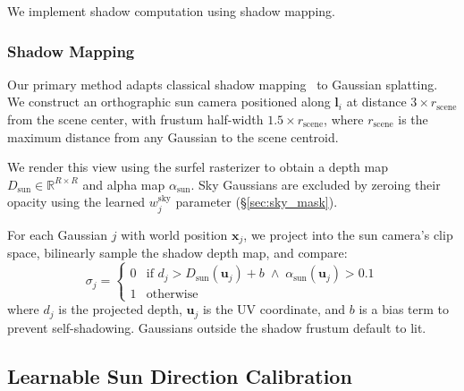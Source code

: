 We implement shadow computation using shadow mapping.

\subsubsection{Shadow Mapping}
\label{sec:shadow_map}

Our primary method adapts classical shadow mapping~\cite{williams1978casting} to Gaussian splatting.
We construct an orthographic sun camera positioned along $\mathbf{l}_i$ at distance $3\times r_{\text{scene}}$ from the scene center, with frustum half-width $1.5\times r_{\text{scene}}$, where $r_{\text{scene}}$ is the maximum distance from any Gaussian to the scene centroid.

We render this view using the surfel rasterizer to obtain a depth map $D_{\text{sun}} \in \mathbb{R}^{R \times R}$ and alpha map $\alpha_{\text{sun}}$.
Sky Gaussians are excluded by zeroing their opacity using the learned $w_j^{\text{sky}}$ parameter (\S\ref{sec:sky_mask}).

For each Gaussian $j$ with world position $\mathbf{x}_j$, we project into the sun camera's clip space, bilinearly sample the shadow depth map, and compare:
\begin{equation}
    \sigma_j = \begin{cases}
        0 & \text{if } d_j > D_{\text{sun}}(\mathbf{u}_j) + b \;\wedge\; \alpha_{\text{sun}}(\mathbf{u}_j) > 0.1 \\
        1 & \text{otherwise}
    \end{cases}
\end{equation}
where $d_j$ is the projected depth, $\mathbf{u}_j$ is the UV coordinate, and $b$ is a bias term to prevent self-shadowing.
Gaussians outside the shadow frustum default to lit.

\subsection{Learnable Sun Direction Calibration}
\label{sec:sun_cal}

